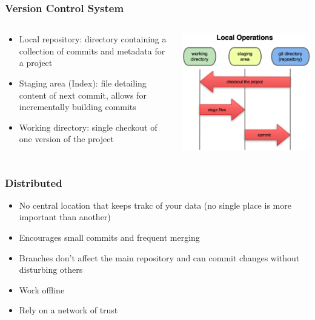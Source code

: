 \documentclass[english,compress]{beamer}
\begin{document}
\frame
{
    \frametitle{Version Control System}
    \begin{columns}
    \begin{column}{.6\textwidth}
        \begin{itemize}
            \item Local repository: directory containing a collection of commits and metadata for a project
            \item Staging area (Index): file detailing content of next commit, allows for incrementally building commits
            \item Working directory: single checkout of one version of the project
        \end{itemize}
    \end{column}
    \begin{column}{.4\textwidth}
        \begin{center}
            \includegraphics[width=.8\textwidth]{figs/sections.png}
        \end{center}
        \end{column}
    \end{columns}
}

\frame
{
    \frametitle{Distributed}
    \begin{itemize}
        \item No central location that keeps trakc of your data (no single place is more important than another)
        \item Encourages small commits and frequent merging
        \item Branches don't affect the main repository and can commit changes without disturbing others
        \item Work offline
        \item Rely on a network of trust
    \end{itemize}
}
\end{document}
